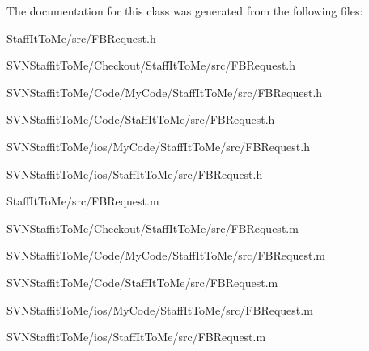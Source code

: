 \-The documentation for this class was generated from the following files\-:\begin{DoxyCompactItemize}
\item 
\-Staff\-It\-To\-Me/src/\-F\-B\-Request.\-h\item 
\-S\-V\-N\-Staffit\-To\-Me/\-Checkout/\-Staff\-It\-To\-Me/src/\-F\-B\-Request.\-h\item 
\-S\-V\-N\-Staffit\-To\-Me/\-Code/\-My\-Code/\-Staff\-It\-To\-Me/src/\-F\-B\-Request.\-h\item 
\-S\-V\-N\-Staffit\-To\-Me/\-Code/\-Staff\-It\-To\-Me/src/\-F\-B\-Request.\-h\item 
\-S\-V\-N\-Staffit\-To\-Me/ios/\-My\-Code/\-Staff\-It\-To\-Me/src/\-F\-B\-Request.\-h\item 
\-S\-V\-N\-Staffit\-To\-Me/ios/\-Staff\-It\-To\-Me/src/\-F\-B\-Request.\-h\item 
\-Staff\-It\-To\-Me/src/\-F\-B\-Request.\-m\item 
\-S\-V\-N\-Staffit\-To\-Me/\-Checkout/\-Staff\-It\-To\-Me/src/\-F\-B\-Request.\-m\item 
\-S\-V\-N\-Staffit\-To\-Me/\-Code/\-My\-Code/\-Staff\-It\-To\-Me/src/\-F\-B\-Request.\-m\item 
\-S\-V\-N\-Staffit\-To\-Me/\-Code/\-Staff\-It\-To\-Me/src/\-F\-B\-Request.\-m\item 
\-S\-V\-N\-Staffit\-To\-Me/ios/\-My\-Code/\-Staff\-It\-To\-Me/src/\-F\-B\-Request.\-m\item 
\-S\-V\-N\-Staffit\-To\-Me/ios/\-Staff\-It\-To\-Me/src/\-F\-B\-Request.\-m\end{DoxyCompactItemize}
